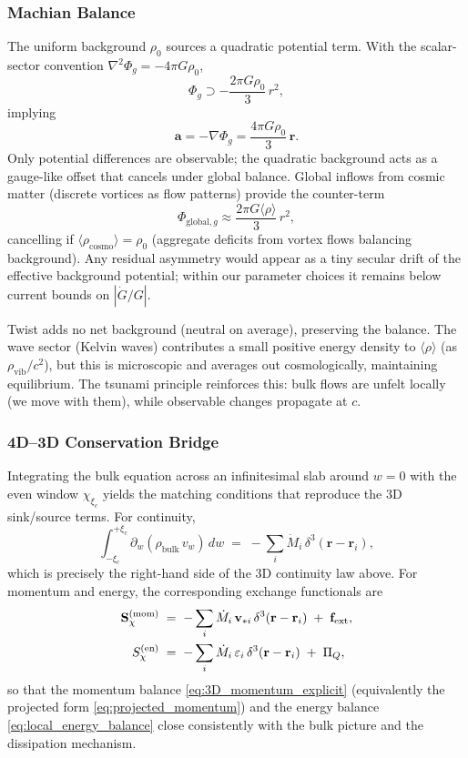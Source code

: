 \subsubsection{Machian Balance}
The uniform background $\rho_0$ sources a quadratic potential term. With the scalar-sector convention $\nabla^2 \Phi_g=-4\pi G\rho_0$,
\begin{equation}
\Phi_g \supset -\frac{2\pi G \rho_0}{3}\,r^2,
\end{equation}
implying
\begin{equation}
\mathbf{a} = -\nabla \Phi_g = \frac{4\pi G \rho_0}{3}\,\mathbf{r}.
\end{equation}
Only potential differences are observable; the quadratic background acts as a gauge-like offset that cancels under global balance. Global inflows from cosmic matter (discrete vortices as flow patterns) provide the counter-term
\begin{equation}
\Phi_{\text{global},g} \approx \frac{2\pi G \langle \rho \rangle}{3}\, r^2,
\end{equation}
cancelling if $\langle \rho_{\text{cosmo}} \rangle = \rho_0$ (aggregate deficits from vortex flows balancing background). Any residual asymmetry would appear as a tiny secular drift of the effective background potential; within our parameter choices it remains below current bounds on $|\dot G/G|$.

Twist adds no net background (neutral on average), preserving the balance. The wave sector (Kelvin waves) contributes a small positive energy density to $\langle \rho \rangle$ (as $\rho_{\text{vib}}/c^2$), but this is microscopic and averages out cosmologically, maintaining equilibrium. The tsunami principle reinforces this: bulk flows are unfelt locally (we move with them), while observable changes propagate at $c$.

\subsubsection{4D–3D Conservation Bridge}
Integrating the bulk equation across an infinitesimal slab around $w=0$ with the even window $\chi_{\xi_c}$ yields the matching conditions that reproduce the $3$D sink/source terms. For continuity,
\begin{equation}
\int_{-\xi_c}^{+\xi_c}\!\partial_w\!\left(\rho_{\text{bulk}}\, v_w\right)\,dw
\;=\; -\sum_i \dot M_i\,\delta^3(\mathbf r-\mathbf r_i),
\end{equation}
which is precisely the right-hand side of the $3$D continuity law above. For momentum and energy, the corresponding exchange functionals are
\begin{align}
\mathbf S_{\chi}^{(\mathrm{mom})} \;&=\; - \sum_i \dot M_i\,\mathbf v_{*i}\,\delta^3(\mathbf r-\mathbf r_i)\;+\;\mathbf f_{\rm ext},\\
S_{\chi}^{(\mathrm{en})} \;&=\; - \sum_i \dot M_i\,\varepsilon_i\,\delta^3(\mathbf r-\mathbf r_i)\;+\;\Pi_Q,
\end{align}
so that the momentum balance \eqref{eq:3D_momentum_explicit} (equivalently the projected form \eqref{eq:projected_momentum}) and the energy balance \eqref{eq:local_energy_balance} close consistently with the bulk picture and the dissipation mechanism.

